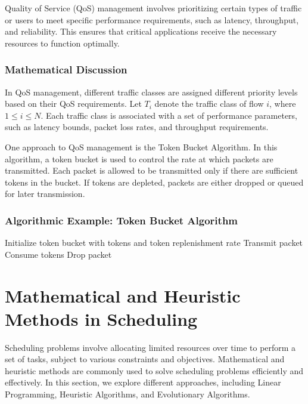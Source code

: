 \documentclass[12pt]{book} %
\begin{document}
Quality of Service (QoS) management involves prioritizing certain types of traffic or users to meet specific performance requirements, such as latency, throughput, and reliability. This ensures that critical applications receive the necessary resources to function optimally.

\subsubsection{Mathematical Discussion}

In QoS management, different traffic classes are assigned different priority levels based on their QoS requirements. Let $T_i$ denote the traffic class of flow $i$, where $1 \leq i \leq N$. Each traffic class is associated with a set of performance parameters, such as latency bounds, packet loss rates, and throughput requirements.

One approach to QoS management is the Token Bucket Algorithm. In this algorithm, a token bucket is used to control the rate at which packets are transmitted. Each packet is allowed to be transmitted only if there are sufficient tokens in the bucket. If tokens are depleted, packets are either dropped or queued for later transmission.

\subsubsection{Algorithmic Example: Token Bucket Algorithm}
\FloatBarrier
\begin{algorithm}[H]
\caption{Token Bucket Algorithm}
\begin{algorithmic}[1]
\State Initialize token bucket with tokens and token replenishment rate
        \State Transmit packet
        \State Consume tokens
    \Else
        \State Drop packet
    \EndIf
\EndWhile
\end{algorithmic}
\end{algorithm}
\FloatBarrier

\section{Mathematical and Heuristic Methods in Scheduling}

Scheduling problems involve allocating limited resources over time to perform a set of tasks, subject to various constraints and objectives. Mathematical and heuristic methods are commonly used to solve scheduling problems efficiently and effectively. In this section, we explore different approaches, including Linear Programming, Heuristic Algorithms, and Evolutionary Algorithms.
\end{document}
